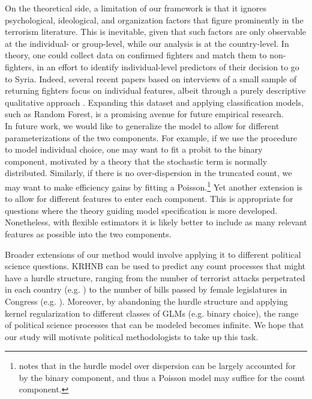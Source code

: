 \documentclass[12pt]{article}
\begin{document}
On the theoretical side, a limitation of our framework is that it ignores psychological, ideological, and organization factors that figure prominently in the terrorism literature. This is inevitable, given that such factors are only observable at the individual- or group-level, while our analysis is at the country-level. In theory, one could collect data on confirmed fighters and match them to non-fighters, in an effort to identify individual-level predictors of their decision to go to Syria. Indeed, several recent papers based on interviews of a small sample of returning fighters focus on individual features, albeit through a purely descriptive qualitative approach \citep{Stenersen2011, Weggemans2014, Nilsson2015}. Expanding this dataset and applying classification models, such as Random Forest, is a promising avenue for future empirical research.	\\

In future work, we would like to generalize the model to allow for different parameterizations of the two components. For example, if we use the procedure to model individual choice, one may want to fit a probit to the binary component, motivated by a theory that the stochastic term is normally distributed. Similarly, if there is no over-dispersion in the truncated count, we may want to make efficiency gains by fitting a Poisson.\footnote{\cite{Zorn1998} notes that in the hurdle model over dispersion can be largely accounted for by the binary component, and thus a Poisson model may suffice for the count component.} Yet another extension is to allow for different features to enter each component. This is appropriate for questions where the theory guiding model specification is more developed. Nonetheless, with flexible estimators it is likely better to include as many relevant features as possible into the two components. 

Broader extensions of our method would involve applying it to different political science questions. KRHNB can be used to predict any count processes that might have a hurdle structure, ranging from the number of terrorist attacks perpetrated in each country (e.g. \cite{Burgoon2006}) to the number of bills passed by female legislatures in Congress (e.g. \cite{Volden2013}). Moreover, by abandoning the hurdle structure and applying kernel regularization to different classes of GLMs (e.g. binary choice), the range of political science processes that can be modeled becomes infinite. We hope that our study will motivate political methodologists to take up this task.	
\end{document}

